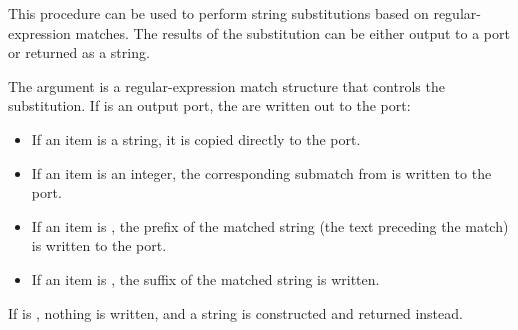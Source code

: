 \begin{desc}
This procedure can be used to perform string substitutions based on
regular-expression matches.
The results of the substitution can be either output to a port or
returned as a string.

The  argument is a regular-expression match structure
that controls the substitution.
If  is an output port, the  are written out to
the port:
\begin{itemize}
    \item If an item is a string, it is copied directly to the port.
    \item If an item is an integer, the corresponding submatch from 
      is written to the port.
    \item If an item is , 
          the prefix of the matched string (the text preceding the match) 
          is written to the port.
    \item If an item is , 
          the suffix of the matched string is written.
\end{itemize}

If  is {\sharpf}, nothing is written, and a string is constructed
and returned instead.
\end{desc}


